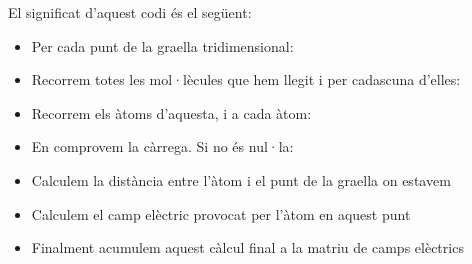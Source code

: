 El significat d'aquest codi és el següent:

\begin{itemize}
  \item Per cada punt de la graella tridimensional:
  \item Recorrem totes les mol·lècules que hem llegit i per cadascuna d'elles:
  \item Recorrem els àtoms d'aquesta, i a cada àtom:
  \item En comprovem la càrrega. Si no és nul·la:
  \item Calculem la distància entre l'àtom i el punt de la graella on estavem
  \item Calculem el camp elèctric provocat per l'àtom en aquest punt
  \item Finalment acumulem aquest càlcul final a la matriu de camps elèctrics
\end{itemize}